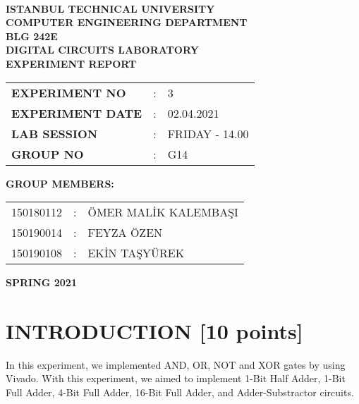 \documentclass[pdftex,12pt,a4paper]{article}
\begin{document}
\begin{titlepage}
\begin{center}
\textbf{}\\
\textbf{\Large{ISTANBUL TECHNICAL UNIVERSITY}}\\
\vspace{0.5cm}
\textbf{\Large{COMPUTER ENGINEERING DEPARTMENT}}\\
\vspace{2cm}
\textbf{\Large{BLG 242E\\ DIGITAL CIRCUITS LABORATORY\\ EXPERIMENT REPORT}}\\
\vspace{2.8cm}
\begin{table}[ht]
\centering
\Large{
\begin{tabular}{lcl}
\textbf{EXPERIMENT NO}  & : & 3 \\
\textbf{EXPERIMENT DATE}  & : & 02.04.2021 \\
\textbf{LAB SESSION}  & : & FRIDAY - 14.00 \\
\textbf{GROUP NO}  & : & G14 \\
\end{tabular}}
\end{table}
\vspace{1cm}
\textbf{\Large{GROUP MEMBERS:}}\\
\begin{table}[ht]
\centering
\Large{
\begin{tabular}{rcl}
150180112  & : & ÖMER MALİK KALEMBAŞI \\
150190014  & : & FEYZA ÖZEN \\
150190108  & : & EKİN TAŞYÜREK \\
\end{tabular}}
\end{table}
\vspace{2.8cm}
\textbf{\Large{SPRING 2021}}

\end{center}

\end{titlepage}

\thispagestyle{empty}
\setcounter{tocdepth}{4}
\tableofcontents
\clearpage

\setcounter{page}{1}

\section{INTRODUCTION [10 points]}
In this experiment, we implemented AND, OR, NOT and XOR gates by using Vivado. With this experiment, we aimed to implement 1-Bit Half Adder, 1-Bit Full Adder,
4-Bit Full Adder, 16-Bit Full Adder, and Adder-Substractor circuits. 
\end{document}
